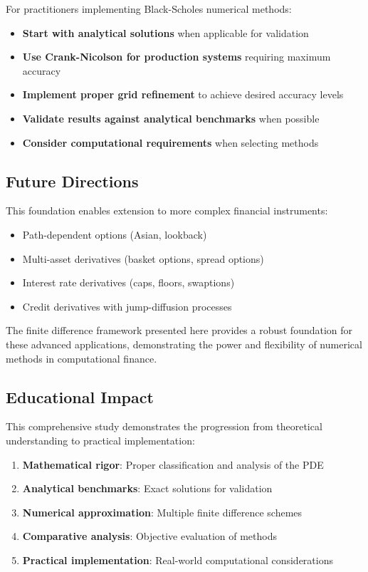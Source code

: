 \documentclass[12pt,a4paper]{article}
\numberwithin{algorithm}{subsection}
\begin{document}
For practitioners implementing Black-Scholes numerical methods:

\begin{itemize}
\item \textbf{Start with analytical solutions} when applicable for validation
\item \textbf{Use Crank-Nicolson for production systems} requiring maximum accuracy
\item \textbf{Implement proper grid refinement} to achieve desired accuracy levels
\item \textbf{Validate results against analytical benchmarks} when possible
\item \textbf{Consider computational requirements} when selecting methods
\end{itemize}

\subsection{Future Directions}

This foundation enables extension to more complex financial instruments:

\begin{itemize}
\item Path-dependent options (Asian, lookback)
\item Multi-asset derivatives (basket options, spread options)
\item Interest rate derivatives (caps, floors, swaptions)
\item Credit derivatives with jump-diffusion processes
\end{itemize}

The finite difference framework presented here provides a robust foundation for these advanced applications, demonstrating the power and flexibility of numerical methods in computational finance.

\subsection{Educational Impact}

This comprehensive study demonstrates the progression from theoretical understanding to practical implementation:

\begin{enumerate}
\item \textbf{Mathematical rigor}: Proper classification and analysis of the PDE
\item \textbf{Analytical benchmarks}: Exact solutions for validation
\item \textbf{Numerical approximation}: Multiple finite difference schemes
\item \textbf{Comparative analysis}: Objective evaluation of methods
\item \textbf{Practical implementation}: Real-world computational considerations
\end{enumerate}
\end{document}
